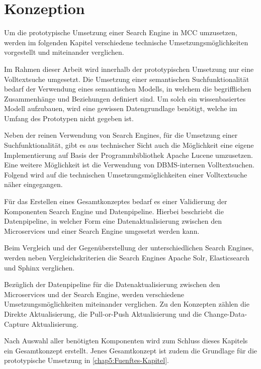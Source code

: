 \chapter{Konzeption\label{chap4:Viertes-Kapitel}}

Um die prototypische Umsetzung einer Search Engine in MCC umzusetzen, werden im folgenden Kapitel verschiedene technische Umsetzungsmöglichkeiten vorgestellt und miteinander verglichen.


Im Rahmen dieser Arbeit wird innerhalb der prototypischen Umsetzung nur eine Volltextsuche umgesetzt. Die Umsetzung einer semantischen Suchfunktionalität bedarf der Verwendung eines semantischen Modells, in welchem die begrifflichen Zusammenhänge und Beziehungen definiert sind. Um solch ein wissenbasiertes Modell aufzubauen, wird eine gewissen Datengrundlage benötigt, welche im Umfang des Prototypen nicht gegeben ist.

Neben der reinen Verwendung von Search Engines, für die Umsetzung einer Suchfunktionalität, gibt es aus technischer Sicht auch die Möglichkeit eine eigene Implementierung auf Basis der Programmbibliothek \glqq Apache Lucene\grqq{} umzusetzen. Eine weitere Möglichkeit ist die Verwendung von DBMS-internen Volltextsuchen. Folgend wird auf die technischen Umsetzungsmöglichkeiten einer Volltextsuche näher eingegangen.

Für das Erstellen eines Gesamtkonzeptes bedarf es einer Validierung der Komponenten \glqq Search Engine\grqq{} und \glqq Datenpipeline\grqq{}. Hierbei beschriebt die Datenpipeline, in welcher Form eine Datenaktualisierung zwischen den Microservices und einer Search Engine umgesetzt werden kann.

Beim Vergleich und der Gegenüberstellung der unterschiedlichen Search Engines, werden neben Vergleichskriterien die Search Engines \glqq Apache Solr\grqq{}, \glqq Elasticsearch\grqq{} und \glqq Sphinx\grqq{} verglichen.

Bezüglich der Datenpipeline für die Datenaktualisierung zwischen den Microservices und der Search Engine, werden verschiedene Umsetzungsmöglichkeiten miteinander verglichen. Zu den Konzepten zählen die \glqq Direkte Aktualisierung\grqq{}, die \glqq Pull-or-Push Aktualisierung\grqq{} und die \glqq Change-Data-Capture Aktualisierung\grqq{}.

Nach Auswahl aller benötigten Komponenten wird zum Schluss dieses Kapitels ein Gesamtkonzept erstellt. Jenes Gesamtkonzept ist zudem die Grundlage für die prototypische Umsetzung in \autoref{chap5:Fuenftes-Kapitel}.

